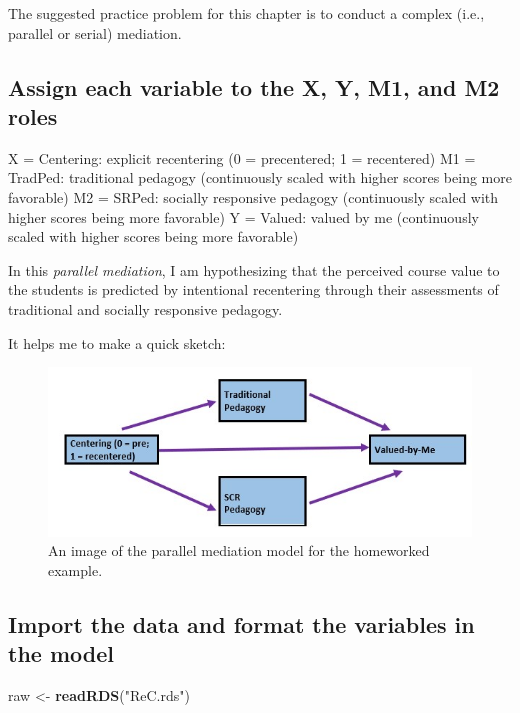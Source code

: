 \documentclass[
  11pt,
]{book}
\newenvironment{Shaded}{\begin{snugshade}}{\end{snugshade}}
\newcommand{\FunctionTok}[1]{\textcolor[rgb]{0.27,0.27,0.27}{\textbf{#1}}}
\newcommand{\NormalTok}[1]{#1}
\newcommand{\OtherTok}[1]{\textcolor[rgb]{0.37,0.37,0.37}{#1}}
\newcommand{\StringTok}[1]{\textcolor[rgb]{0.5,0.5,0.5}{#1}}
\begin{document}
The suggested practice problem for this chapter is to conduct a complex (i.e., parallel or serial) mediation.

\hypertarget{assign-each-variable-to-the-x-y-m1-and-m2-roles}{%
\subsection*{Assign each variable to the X, Y, M1, and M2 roles}\label{assign-each-variable-to-the-x-y-m1-and-m2-roles}}


X = Centering: explicit recentering (0 = precentered; 1 = recentered) M1 = TradPed: traditional pedagogy (continuously scaled with higher scores being more favorable) M2 = SRPed: socially responsive pedagogy (continuously scaled with higher scores being more favorable) Y = Valued: valued by me (continuously scaled with higher scores being more favorable)

In this \emph{parallel mediation}, I am hypothesizing that the perceived course value to the students is predicted by intentional recentering through their assessments of traditional and socially responsive pedagogy.

It helps me to make a quick sketch:

\begin{figure}
\centering
\includegraphics{Worked_Examples/images/CompMedHWfig.jpg}
\caption{An image of the parallel mediation model for the homeworked example.}
\end{figure}

\hypertarget{import-the-data-and-format-the-variables-in-the-model-1}{%
\subsection*{Import the data and format the variables in the model}\label{import-the-data-and-format-the-variables-in-the-model-1}}


\begin{Shaded}
\begin{Highlighting}[]
\NormalTok{raw }\OtherTok{\textless{}{-}} \FunctionTok{readRDS}\NormalTok{(}\StringTok{"ReC.rds"}\NormalTok{)}
\end{Highlighting}
\end{Shaded}
\end{document}

